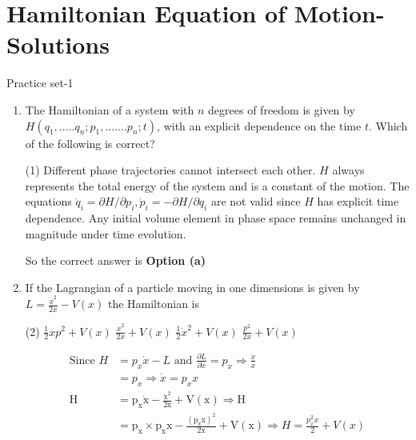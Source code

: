 \chapter{Hamiltonian Equation of Motion-Solutions}
\begin{abox}
	Practice set-1
\end{abox}
\begin{enumerate}
	\item  The Hamiltonian of a system with $n$ degrees of freedom is given by $H\left(q_{1}, \ldots . . q_{n} ; p_{1}, \ldots \ldots . p_{n} ; t\right)$, with an explicit dependence on the time $t$. Which of the following is correct?
	{}
	\begin{tasks}(1)
		\task[\textbf{a.}]Different phase trajectories cannot intersect each other.
		\task[\textbf{b.}]$H$ always represents the total energy of the system and is a constant of the motion.
		\task[\textbf{c.}]The equations $\dot{q}_{i}=\partial H / \partial p_{i}, \dot{p}_{i}=-\partial H / \partial q_{i}$ are not valid since $H$ has explicit time dependence.
		\task[\textbf{d.}]  Any initial volume element in phase space remains unchanged in magnitude under time evolution.
	\end{tasks}
\begin{answer}
	So the correct answer is \textbf{Option (a)}
\end{answer}
	\item  If the Lagrangian of a particle moving in one dimensions is given by $L=\frac{\dot{x}^{2}}{2 x}-V(x)$ the Hamiltonian is
	{}
	\begin{tasks}(2)
		\task[\textbf{a.}]$\frac{1}{2} x p^{2}+V(x)$
		\task[\textbf{b.}]$\frac{\dot{x}^{2}}{2 x}+V(x)$
		\task[\textbf{c.}] $\frac{1}{2} \dot{x}^{2}+V(x)$
		\task[\textbf{d.}] $\frac{p^{2}}{2 x}+V(x)$
	\end{tasks}
\begin{answer}
	\begin{align*}
	\text{Since }H&=p_{x} \dot{x}-L\text{ and }\frac{\partial L}{\partial \dot{x}}=p_{x} \Rightarrow \frac{\dot{x}}{x}\\&=p_{x} \Rightarrow \dot{x}=p_{x} x\\
	\mathrm{H}&=\mathrm{p}_{\mathrm{x}} \dot{\mathrm{x}}-\frac{\dot{\mathrm{x}}^{2}}{2 \mathrm{x}}+\mathrm{V}(\mathrm{x}) \Rightarrow \mathrm{H}\\&=\mathrm{p}_{\mathrm{x}} \times \mathrm{p}_{\mathrm{x}} \mathrm{x}-\frac{\left(\mathrm{p}_{\mathrm{x}} \mathrm{x}\right)^{2}}{2 \mathrm{x}}+\mathrm{V}(\mathrm{x}) \Rightarrow H=\frac{p_{x}^{2} x}{2}+V(x)

\end{align*}
\end{answer}
\end{enumerate}
